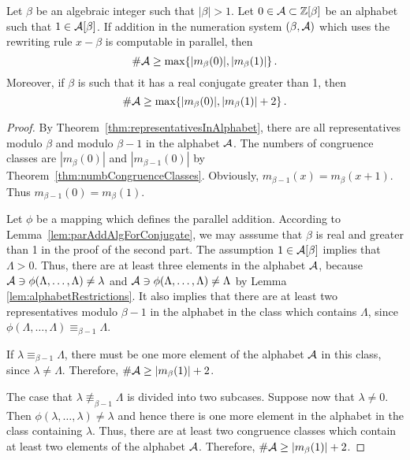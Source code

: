 \begin{thm}
Let $\beta$ be an algebraic integer such that $|\beta|>1$. Let $0\in \mathcal{A}\subset \mathbb{Z}[\beta]$ be an alphabet such that $1\in \mathcal{A}[\beta]$. If addition in the numeration system $(\beta, \mathcal{A})$ which uses the rewriting rule $x-\beta$ is computable in parallel, then
$$
\#\mathcal{A} \geq \max \{|m_\beta(0)|, |m_\beta(1)|\}\,.
$$
Moreover, if $\beta$ is such that it has a real conjugate greater than 1, then 
$$
\#\mathcal{A} \geq \max \{|m_\beta(0)|, |m_\beta(1)|+2\}\,.
$$
\end{thm}
\begin{proof}
By Theorem~\ref{thm:representativesInAlphabet}, there are all representatives modulo $\beta$ and modulo $\beta-1$ in the alphabet $\mathcal{A}$. The numbers of congruence classes are $|m_\beta(0)|$ and $|m_{\beta-1}(0)|$ by Theorem~\ref{thm:numbCongruenceClasses}. Obviously, $m_{\beta-1}(x) = m_\beta (x+1)$. Thus $m_{\beta-1}(0) = m_\beta (1)$.

Let $\phi$ be a mapping which defines the parallel addition. According to Lemma~\ref{lem:parAddAlgForConjugate}, we may asssume that $\beta$ is real and greater than 1 in the proof of the second part. The assumption $1\in \mathcal{A}[\beta]$ implies that $\Lambda>0$. Thus, there are at least three elements in the alphabet $\mathcal{A}$, because $\mathcal{A}\ni\phi(\Lambda,\dots,\Lambda)\neq \lambda$ and $\mathcal{A}\ni\phi(\Lambda,\dots,\Lambda)\neq \Lambda$ by Lemma \ref{lem:alphabetRestrictions}. It also implies that there are at least two representatives modulo $\beta-1$ in the alphabet in the class which contains $\Lambda$, since $\phi(\Lambda,\dots,\Lambda)\equiv_{\beta-1} \Lambda$.  

If $\lambda\equiv_{\beta-1}\Lambda$, there must be one more element of the alphabet $\mathcal{A}$ in this class, since $\lambda \neq \Lambda$. Therefore, $\#\mathcal{A}\geq |m_\beta(1)|+2$. 

The case that $\lambda\not\equiv_{\beta-1}\Lambda$ is divided into two subcases. Suppose now that $\lambda\neq 0$. Then $\phi(\lambda,\dots,\lambda)\neq \lambda$ and hence there is one more element in the alphabet in the class containing $\lambda$. Thus, there are at least two congruence classes which contain at least two elements of the alphabet $\mathcal{A}$. Therefore, $\#\mathcal{A}\geq |m_\beta(1)|+2$.


\end{proof}
